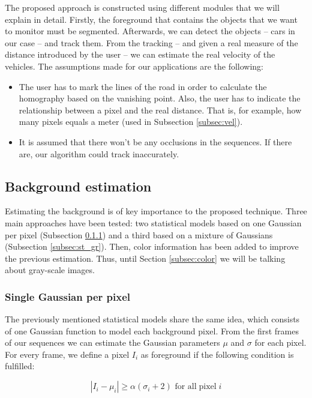 \documentclass{article}
\begin{document}
The proposed approach is constructed using different modules that we will explain in detail. Firstly, the foreground that contains the objects that we want to monitor must be segmented. Afterwards, we can detect the objects -- cars in our case -- and track them. From the tracking -- and given a real measure of the distance introduced by the user -- we can estimate the real velocity of the vehicles. The assumptions made for our applications are the following:
\begin{itemize}
	\item The user has to mark the lines of the road in order to calculate the homography based on the vanishing point. Also, the user has to indicate the relationship between a pixel and the real distance. That is, for example, how many pixels equals a meter (used in Subsection \ref{subsec:vel}).
    \item It is assumed that there won't be any occlusions in the sequences. If there are, our algorithm could track inaccurately.
\end{itemize}

\subsection{Background estimation}
\label{subsec:back}

Estimating the background is of key importance to the proposed technique. Three main approaches have been tested: two statistical models based on one Gaussian per pixel (Subsection \ref{subsec:sgGaus}) and a third based on a mixture of Gaussians (Subsection \ref{subsec:st_gr}). Then, color information has been added to improve the previous estimation. Thus, until Section \ref{subsec:color} we will be talking about gray-scale images.

\subsubsection{Single Gaussian per pixel}
\label{subsec:sgGaus}

The previously mentioned statistical models share the same idea, which consists of one Gaussian function to model each background pixel. From the first frames of our sequences we can estimate the Gaussian parameters \(\mu\) and \(\sigma\) for each pixel. For every frame, we define a pixel \(I_i\) as foreground if the following condition is fulfilled:

\begin{equation}
|I_i-\mu_i| \geq \alpha(\sigma_i+2) \mbox{ for all} \operatorname{pixel} i
\end{equation}
\end{document}
